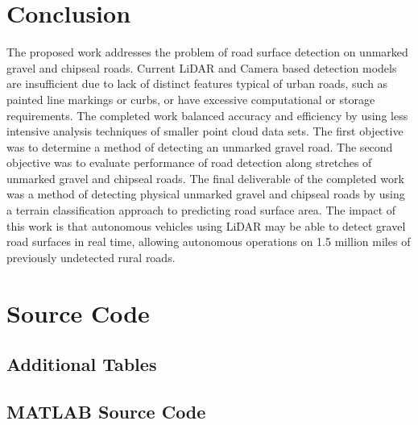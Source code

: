 \documentclass[numbered,pdftex]{ohio-etd}
\begin{document}
\chapter{Conclusion}
{
	
	{The proposed work addresses the problem of road surface detection on unmarked gravel and chipseal roads. Current LiDAR and Camera based detection models are insufficient due to lack of distinct features typical of urban roads, such as painted line markings or curbs, or have excessive computational or storage requirements. The completed work balanced accuracy and efficiency by using less intensive analysis techniques of smaller point cloud data sets. The first objective was to determine a method of detecting an unmarked gravel road. The second objective was to evaluate performance of road detection along stretches of unmarked gravel and chipseal roads. The final deliverable of the completed work was a method of detecting physical unmarked gravel and chipseal roads by using a terrain classification approach to predicting road surface area. The impact of this work is that autonomous vehicles using LiDAR may be able to detect gravel road surfaces in real time, allowing autonomous operations on 1.5 million miles of previously undetected rural roads.}

}


\appendix

\chapter{Source Code}{
	
	\section{Additional Tables}{
	
	
	
	}
	
	\section{MATLAB Source Code}{
		
%			
%			
%			
%			
%				
		
	} %

} %
\end{document}
